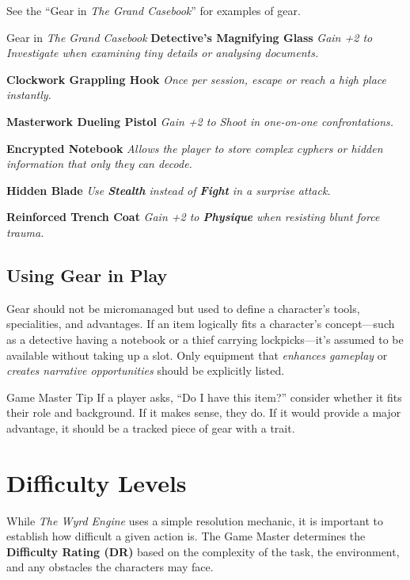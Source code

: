 See the ``Gear in \emph{The Grand Casebook}'' for examples of gear.

\begin{DndSidebar}[float=!t]{Gear in \emph{The Grand Casebook}}
\textbf{Detective’s Magnifying Glass}  
\emph{Gain +2 to Investigate when examining tiny details or analysing documents.}

\textbf{Clockwork Grappling Hook}  
\emph{Once per session, escape or reach a high place instantly.}

\textbf{Masterwork Dueling Pistol}  
\emph{Gain +2 to Shoot in one-on-one confrontations.}

\textbf{Encrypted Notebook}  
\emph{Allows the player to store complex cyphers or hidden information that only they can decode.}

\textbf{Hidden Blade}  
\emph{Use \textbf{Stealth} instead of \textbf{Fight} in a surprise attack.}

\textbf{Reinforced Trench Coat}  
\emph{Gain +2 to \textbf{Physique} when resisting blunt force trauma.}
\end{DndSidebar}

\subsection{Using Gear in Play}
Gear should not be micromanaged but used to define a character’s tools, specialities, and advantages. If an item logically fits a character’s concept—such as a detective having a notebook or a thief carrying lockpicks—it’s assumed to be available without taking up a slot. Only equipment that \emph{enhances gameplay} or \emph{creates narrative opportunities} should be explicitly listed.

\begin{DndComment}{Game Master Tip}
If a player asks, “Do I have this item?” consider whether it fits their role and background. If it makes sense, they do. If it would provide a major advantage, it should be a tracked piece of gear with a trait.
\end{DndComment}


\section{Difficulty Levels}

While \emph{The Wyrd Engine} uses a simple resolution mechanic, it is important to establish how difficult a given action is. The Game Master determines the \textbf{Difficulty Rating (DR)} based on the complexity of the task, the environment, and any obstacles the characters may face.

